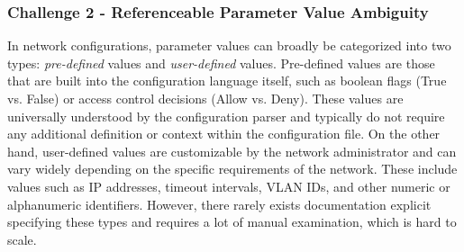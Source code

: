 \subsubsection{Challenge 2 - Referenceable Parameter Value Ambiguity}

In network configurations, parameter values can broadly be categorized into two types: \textit{pre-defined} values and \textit{user-defined} values. Pre-defined values are those that are built into the configuration language itself, such as boolean flags (True vs. False) or access control decisions (Allow vs. Deny). These values are universally understood by the configuration parser and typically do not require any additional definition or context within the configuration file. On the other hand, user-defined values are customizable by the network administrator and can vary widely depending on the specific requirements of the network. These include values such as IP addresses, timeout intervals, VLAN IDs, and other numeric or alphanumeric identifiers. However, there rarely exists documentation explicit specifying these types and requires a lot of manual examination, which is hard to scale.

